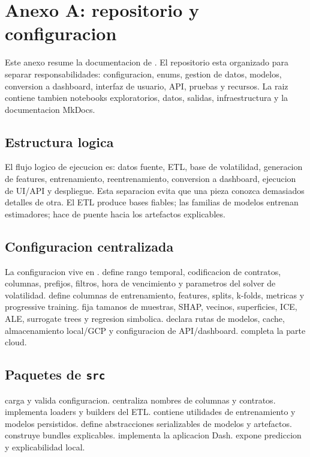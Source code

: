 \chapter{Anexo A: repositorio y configuracion}

Este anexo resume la documentacion de . El repositorio esta organizado para separar responsabilidades: configuracion, enums, gestion de datos, modelos, conversion a dashboard, interfaz de usuario, API, pruebas y recursos. La raiz contiene tambien notebooks exploratorios, datos, salidas, infraestructura y la documentacion MkDocs.

\section{Estructura logica}

El flujo logico de ejecucion es: datos fuente, ETL, base de volatilidad, generacion de features, entrenamiento, reentrenamiento, conversion a dashboard, ejecucion de UI/API y despliegue. Esta separacion evita que una pieza conozca demasiados detalles de otra. El ETL produce bases fiables; las familias de modelos entrenan estimadores;  hace de puente hacia los artefactos explicables.

\section{Configuracion centralizada}

La configuracion vive en .  define rango temporal, codificacion de contratos, columnas, prefijos, filtros, hora de vencimiento y parametros del solver de volatilidad.  define columnas de entrenamiento, features, splits, k-folds, metricas y progressive training.  fija tamanos de muestras, SHAP, vecinos, superficies, ICE, ALE, surrogate trees y regresion simbolica.  declara rutas de modelos, cache, almacenamiento local/GCP y configuracion de API/dashboard.  completa la parte cloud.

\section{Paquetes de \texttt{src}}

 carga y valida configuracion.  centraliza nombres de columnas y contratos.  implementa loaders y builders del ETL.  contiene utilidades de entrenamiento y modelos persistidos.  define abstracciones serializables de modelos y artefactos.  construye bundles explicables.  implementa la aplicacion Dash.  expone prediccion y explicabilidad local.

